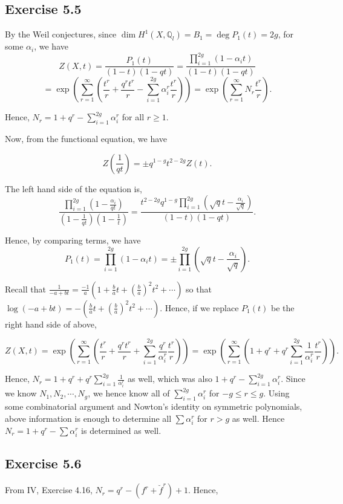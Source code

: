 \documentclass[11pt]{amsart}          %
\newcommand{\bbQ}{\mathbb{Q}}
\begin{document}
\subsection*{Exercise 5.5} By the Weil conjectures, since $\dim H^1(X, \bbQ_l) = B_1 = \deg P_1 (t) = 2g$, for some $\alpha_i$, we have
$$Z(X, t) = \frac{P_1(t)}{(1-t)(1-qt)} = \frac{\prod_{i=1} ^{2g} (1-\alpha_i t)}{(1-t)(1-qt)}$$
$$= \exp (\sum_{r=1} ^{\infty} (\frac{t^r}{r} + \frac{q^r t^r}{r} - \sum_{i=1} ^{2g} \alpha_i ^r \frac{t^r}{r})) = \exp (\sum_{r=1} ^{\infty} N_r \frac{t^r}{r}).$$

Hence, $N_r = 1 + q^r - \sum_{i=1} ^{2g} \alpha_i ^r$ for all $r \geq 1$. 

Now, from the functional equation, we have

$$Z(\frac{1}{qt}) = \pm  q^{1-g} t^{2-2g} Z(t).$$

The left hand side of the equation is,
$$\frac{\prod_{i=1} ^{2g} (1- \frac{\alpha_i}{qt})}{(1- \frac{1}{qt})(1- \frac{1}{t})} = \frac{ t^{2-2g} q^{1-g} \prod_{i=1} ^{2g} (\sqrt{q} t - \frac{\alpha_i}{\sqrt{q}})}{(1-t)(1-qt)}.$$

Hence, by comparing terms, we have
$$P_1(t) = \prod_{i=1} ^{2g} (1- \alpha_i t) = \pm \prod _{i=1} ^{2g} (\sqrt{q} t - \frac{\alpha_i}{\sqrt{q}}).$$

Recall that $\frac{1}{-a+bt} = \frac{-1}{a}(1 + \frac{b}{a} t + (\frac{b}{a})^2 t^2 + \cdots )$ so that $\log(-a + bt) = - (\frac{b}{a} t + (\frac{b}{a})^2 t^2 + \cdots).$ Hence, if we replace $P_1(t)$ be the right hand side of above,

$$Z(X, t) = \exp (\sum_{r=1} ^{\infty} (\frac{t^r}{r} + \frac{q^r t^r}{r} + \sum_{i=1} ^{2g} \frac{q^r}{\alpha_i ^r} \frac{t^r}{r})) = \exp (\sum_{r=1} ^{\infty} (1+ q^r + q^r \sum_{i=1} ^{2g} \frac{1}{\alpha_i ^r} \frac{t^r}{r})).$$

Hence, $N_r = 1 + q^r + q^r \sum_{i=1} ^{2g} \frac{1}{\alpha_i ^r}$ as well, which was also $1 + q^r - \sum_{i=1} ^{2g} \alpha_i ^r$. Since we know $N_1, N_2, \cdots, N_g$, we hence know all of $\sum_{i=1} ^{2g} \alpha_i ^{r}$ for $ -g \leq r \leq g$. Using some combinatorial argument and Nowton's identity on symmetric polynomials, above information is enough to determine all $\sum \alpha_i ^r$ for $r > g$ as well. Hence $N_r = 1+ q^r - \sum \alpha_i ^r$ is determined as well.

\subsection*{Exercise 5.6} From IV, Exercise 4.16, $N_r = q^r - (f^r + \breve{f} ^r) + 1$. Hence,
\end{document}
